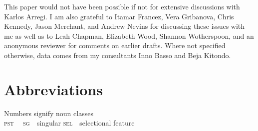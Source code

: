 \documentclass[output=paper,newtxmath,modfonts,nonflat,hidelinks]{langsci/langscibook}
\begin{document}
This paper would not have been possible if not for extensive discussions with Karlos Arregi. I am also grateful to Itamar Francez, Vera Gribanova, Chris Kennedy, Jason Merchant, and Andrew Nevins for discussing these issues with me as well as to Leah Chapman, Elizabeth Wood, Shannon Wotherspoon, and an anonymous reviewer for comments on earlier drafts.  Where not specified otherwise, data comes from my consultants Inno Basso and Beja Kitondo.

\section*{Abbreviations} \label{sec:pesetsky:abbreviations}


\noindent Numbers signify noun classes \\ \noindent \textsc{pst}~~ \hfill \textsc{sg}~~singular \hfill \textsc{sel}~~selectional feature   

\sloppy
\printbibliography[heading=subbibliography,notkeyword=this]
\end{document}
